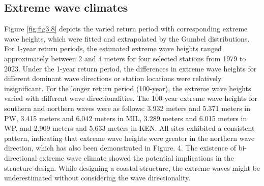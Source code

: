 \subsection{Extreme wave climates}
\label{c3_Extreme wave climates}

Figure \ref{fig:fig3.8} depicts the varied return period with corresponding
extreme wave heights, which were fitted and extrapolated by the Gumbel
distributions. For 1-year return periods, the estimated extreme wave heights
ranged approximately between 2 and 4 meters for four selected stations from 1979
to 2023. Under the 1-year return period, the differences in extreme wave heights
for different dominant wave directions or station locations were relatively
insignificant. For the longer return period (100-year), the extreme wave heights
varied with different wave directionalities. The 100-year extreme wave heights
for southern and northern waves were as follows: 3.932 meters and 5.371 meters
in PW, 3.415 meters and 6.042 meters in MIL, 3.289 meters and 6.015 meters in
WP, and 2.909 meters and 5.633 meters in KEN. All sites exhibited a consistent
pattern, indicating that extreme wave heights were greater in the northern wave
direction, which has also been demonstrated in Figure. 4. The existence of
bi-directional extreme wave climate showed the potential implications in the
structure design. While designing a coastal structure, the extreme waves might
be underestimated without considering the wave directionality.

